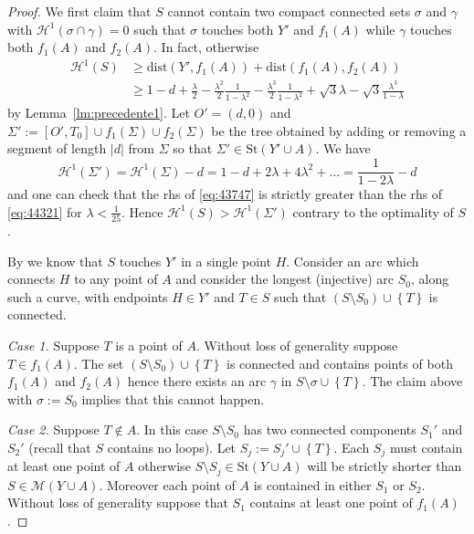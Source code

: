 \documentclass{amsart}
\renewcommand{\H}{\mathcal H}
\newcommand{\abs}[1]{\left\vert #1 \right\vert}
\newcommand{\ENCLOSE}[1]{\left\{#1\right\}}
\newcommand{\St}{\mathrm{St}}
\newcommand{\M}{\mathcal{M}}
\renewcommand{\H}{\mathcal{H}}
\newcommand{\dist}{\mathrm{dist}}
\theoremstyle{definition}
\theoremstyle{remark}
\begin{document}
\begin{proof}
  We first claim that $S$ cannot contain 
  two compact connected sets 
  $\sigma$ and $\gamma$
  with $\H^1(\sigma\cap \gamma)=0$
  such that $\sigma$ touches both $Y'$ and $f_1(A)$ 
  while $\gamma$ touches both $f_1(A)$ and $f_2(A)$.
  In fact, otherwise
  \begin{equation}
  \label{eq:43747}
  \begin{aligned}
    \H^1(S)
    &\ge \dist(Y', f_1(A)) + \dist(f_1(A), f_2(A))
    \\
    &\ge 
    1 - d + \frac{\lambda} 2 
      - \frac{\lambda^2}{2}\frac{1}{1-\lambda^2}
      - \frac{\lambda^3}{2}\frac{1}{1-\lambda^2} 
     +
     \sqrt 3 \lambda - \sqrt 3 \frac{\lambda^3}{1-\lambda}
  \end{aligned}
  \end{equation}
  by Lemma~\ref{lm:precedente1}.
  Let $O'=(d,0)$ and $\Sigma':=[O',T_0] \cup f_1(\Sigma) \cup f_2(\Sigma)$ 
  be the tree obtained by adding or removing a segment of length 
  $\abs{d}$ from $\Sigma$ so that $\Sigma'\in \St(Y'\cup A)$.
  We have  
  \begin{equation}\label{eq:44321}
    \H^1(\Sigma')
    = \H^1(\Sigma) - d 
    = 1 - d + 2 \lambda + 4 \lambda^2 + \dots 
    = \frac{1}{1-2\lambda}-d
  \end{equation}
  and one can check that the rhs of \eqref{eq:43747} is
  strictly greater than the rhs of \eqref{eq:44321}
  for $\lambda < \frac 1 {25}$.
  Hence $\H^1(S) > \H^1(\Sigma')$ contrary 
  to the optimality of $S$.
  
  By \cite{PaoSte12} we know that $S$ touches $Y'$ in a single point $H$.
  Consider an arc which connects $H$ to any point of $A$
  and consider the longest (injective) arc $S_0$, along such a curve,
  with endpoints $H\in Y'$ and $T\in S$
  such that $(S\setminus S_0) \cup \ENCLOSE{T}$ is connected.
  
  \emph{Case 1.} 
  Suppose $T$ is a point of $A$.
  Without loss of generality suppose $T\in f_1(A)$.
  The set $(S\setminus S_0)\cup\ENCLOSE{T}$
  is connected and contains points of both $f_1(A)$
  and $f_2(A)$ hence there exists an arc $\gamma$ 
  in $S\setminus \sigma\cup\ENCLOSE{T}$.
  The claim above with $\sigma:=S_0$ implies that this cannot happen.
  
  \emph{Case 2.} Suppose $T\not \in A$.
  In this case $S\setminus S_0$ has two connected components 
  $S_1'$ and $S_2'$ (recall that $S$ contains no loops).
  Let $S_j:=S_j'\cup \ENCLOSE{T}$.
  Each $S_j$ must contain at least one point of $A$ otherwise 
  $S\setminus S_j\in \St(Y\cup A)$ will be 
  strictly shorter than $S\in \M(Y\cup A)$.
  Moreover each point of $A$ is contained in either $S_1$ or $S_2$.
  Without loss of generality suppose that $S_1$ 
  contains at least one point of $f_1(A)$.
  

\end{proof}
\end{document}
